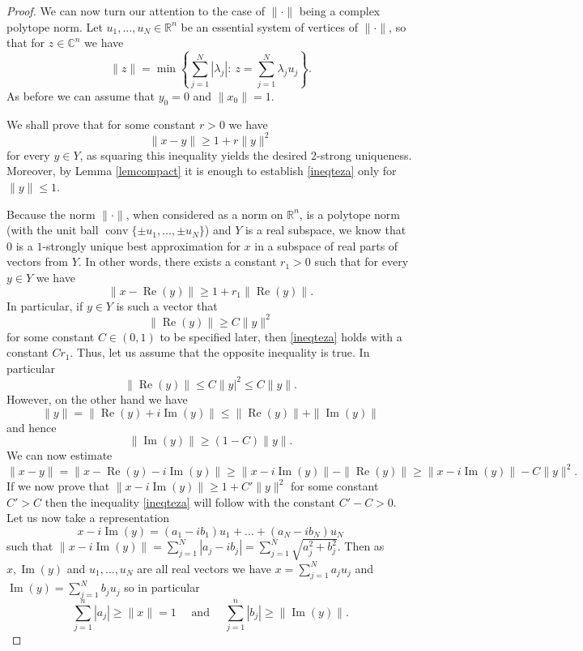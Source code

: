 \documentclass[10pt,a4paper]{amsart}
\DeclareMathOperator{\conv}{conv}
\DeclareMathOperator{\im}{Im}
\DeclareMathOperator{\re}{Re}
\begin{document}
\begin{proof}
We can now turn our attention to the case of $\| \cdot \|$ being a complex polytope norm. Let $u_1, \ldots, u_N \in \mathbb{R}^n$ be an essential system of vertices of $\| \cdot \|$, so that for $z \in \mathbb{C}^n$ we have
$$\|z\| = \min \left \{ \sum_{j=1}^{N} |\lambda_j|: \ z = \sum_{j=1}^{N} \lambda_j u_j \right \}.$$
As before we can assume that $y_0=0$ and $\|x_0\|=1$.

We shall prove that for some constant $r>0$ we have
\begin{equation}
\label{ineqteza}
\|x-y\| \geq 1 + r\|y\|^2
\end{equation}
for every $y \in Y$, as squaring this inequality yields the desired $2$-strong uniqueness. Moreover, by Lemma \ref{lemcompact} it is enough to establish \eqref{ineqteza} only for $\|y\| \leq 1$.

Because the norm $ \| \cdot \|$, when considered as a norm on $\mathbb{R}^n$, is a polytope norm (with the unit ball $\conv \{\pm u_1, \ldots, \pm u_N\}$) and $Y$ is a real subspace, we know that $0$ is a $1$-strongly unique best approximation for $x$ in a subspace of real parts of vectors from $Y$. In other words, there exists a constant $r_1>0$ such that for every $y \in Y$ we have
$$\|x-\re(y)\| \geq 1 + r_1\|\re(y)\|.$$
In particular, if $y \in Y$ is such a vector that
$$\|\re(y)\| \geq C \|y\|^2$$
for some constant $C \in (0, 1)$ to be specified later, then \eqref{ineqteza} holds with a constant $Cr_1$. Thus, let us assume that the opposite inequality is true. In particular
$$\|\re(y)\| \leq C \|y|^2 \leq C \|y\|.$$
However, on the other hand we have
$$\|y\| = \|\re(y) + i\im(y)\| \leq \|\re(y)\| + \|\im(y)\|$$
and hence
\begin{equation}
\label{ineqim}
\|\im(y)\| \geq (1-C)\|y\|.
\end{equation}
We can now estimate
$$\|x-y\| = \|x - \re(y) - i\im(y)\| \geq \|x - i \im(y)\| - \|\re(y)\| \geq \|x - i \im(y)\| - C\|y\|^2.$$
If we now prove that $\|x - i \im(y)\| \geq 1 + C'\|y\|^2$ for some constant $C'>C$ then the inequality \eqref{ineqteza} will follow with the constant $C'-C>0$. Let us now take a representation
$$x - i \im(y) = (a_1 - ib_1)u_1 + \ldots + (a_N - ib_N)u_N$$
such that $\|x - i \im(y)\| = \sum_{j=1}^{N} |a_j - ib_j| = \sum_{j=1}^{N} \sqrt{a_j^2 + b_j^2}$. Then as $x, \im(y)$ and $u_1, \ldots, u_N$ are all real vectors we have $x = \sum_{j=1}^{N} a_ju_j$ and $\im(y) = \sum_{j=1}^{N} b_ju_j$ so in particular 
\begin{equation}
\label{oszacowania}
\sum_{j=1}^{n} |a_j| \geq \|x\|=1 \quad \text{  and  } \quad \sum_{j=1}^{n} |b_j| \geq \|\im(y)\|.

\end{equation}
\end{proof}
\end{document}
